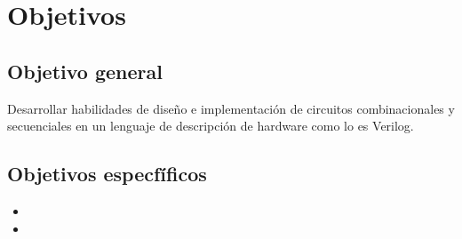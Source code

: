 \newpage
\section{Objetivos}

\subsection{Objetivo general}

Desarrollar habilidades de dise\~ no e implementaci\' on de circuitos combinacionales y secuenciales en un lenguaje de descripci\' on de hardware como lo es Verilog.

\subsection{Objetivos especf\' ificos}
\begin{itemize}
\item 
\item 
\end{itemize}



